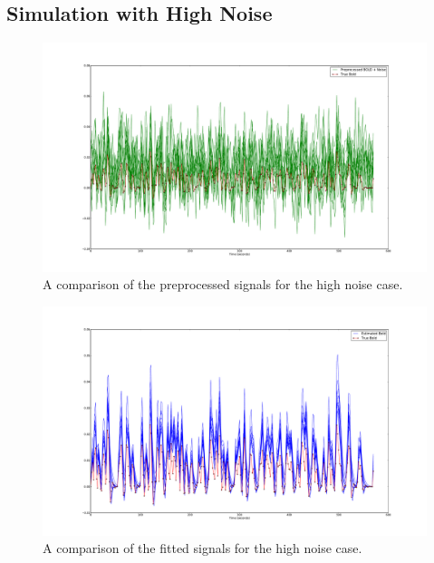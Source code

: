 \subsection{Simulation with High Noise}
\label{sec:SimHighNoise}

\begin{figure}
\includegraphics[clip=true,trim=6cm 2cm 5cm 3.5cm,width=15cm]{images/preprocessed_highnoise}
\caption{A comparison of the preprocessed signals for the high noise case.}
\label{fig:PreprocessedHighNoise}
\end{figure}

\begin{figure}
\includegraphics[clip=true,trim=6cm 2cm 5cm 3.5cm,width=15cm]{images/comparison_highnoise}
\caption{A comparison of the fitted signals for the high noise case.}
\label{fig:FitComparisonHighNoise}
\end{figure}

